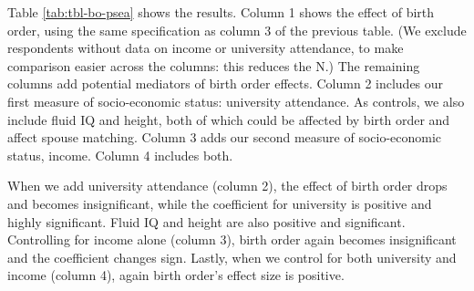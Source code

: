 \documentclass[
]{article}
\begin{document}
Table \ref{tab:tbl-bo-psea} shows the results. Column 1 shows the
effect of birth order, using the same specification as column 3 of the
previous table. (We exclude respondents without data on income or
university attendance, to make comparison easier across the columns:
this reduces the N.) The remaining columns add potential mediators of
birth order effects. Column 2 includes our first measure of
socio-economic status: university attendance. As controls, we also
include fluid IQ and height, both of which could be affected by birth
order and affect spouse matching. Column 3 adds our second measure of
socio-economic status, income. Column 4 includes both.

When we add university attendance (column 2), the effect of birth order
drops and becomes insignificant, while the coefficient for university is
positive and highly significant. Fluid IQ and height are also positive
and significant. Controlling for income alone (column 3), birth order
again becomes insignificant and the coefficient changes sign. Lastly,
when we control for both university and income (column 4), again birth
order's effect size is positive.

 
  \providecommand{\huxb}[2]{\arrayrulecolor[RGB]{#1}\global\arrayrulewidth=#2pt}
  \providecommand{\huxvb}[2]{\color[RGB]{#1}\vrule width #2pt}
  \providecommand{\huxtpad}[1]{\rule{0pt}{#1}}
  \providecommand{\huxbpad}[1]{\rule[-#1]{0pt}{#1}}
\end{document}
